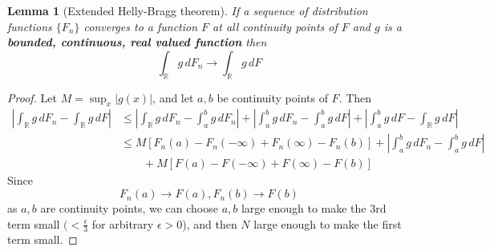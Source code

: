 \documentclass[10pt, oneside, reqno]{amsart}
\theoremstyle{plain}%
\newtheorem{lem}[thm]{Lemma}
\theoremstyle{definition}
\theoremstyle{remark}
\newcommand{\R}{\mathbb{R}}
\begin{document}
\begin{lem}[Extended Helly-Bragg theorem] \label{lem:extendedhelly}
	If a sequence of distribution functions $\{ F_n \}$ converges to a function $F$ at all continuity points of $F$ and $g$ is a \textbf{bounded, continuous, real valued function} then \[
		\int_\R g \,dF_n \rightarrow \int_\R g \, dF
	\]
\end{lem}
\begin{proof}
	Let $M = \sup_x | g(x) |$, and let $a,b$ be continuity points of $F$.  Then 
	\begin{align*}
		\left| \int_\R g \, dF_n - \int_\R g \, dF \right| &\leq \left| \int_\R g \, dF_n - \int_a^b g \, dF_n \right| + \left| \int_a^b g \, dF_n - \int_a^b g \, dF \right| + \left| \int_a^b g \, dF - \int_\R g \, dF \right| \\
		&\leq M[F_n(a) - F_n(-\infty) + F_n(\infty) - F_n(b)] + \left| \int_a^b g \, dF_n - \int_a^b g \, dF \right| \\
		&\qquad  + M[F(a) - F(-\infty) + F(\infty) - F(b)] 
	\end{align*} Since \[
		F_n(a) \rightarrow F(a), F_n(b) \rightarrow F(b)
	\] as $a, b$ are continuity points, we can choose $a, b$ large enough to make the 3rd term small $(< \frac{\epsilon}{3}$ for arbitrary $\epsilon > 0$), and then $N$ large enough to make the first term small. 
	

\end{proof}
\end{document}
